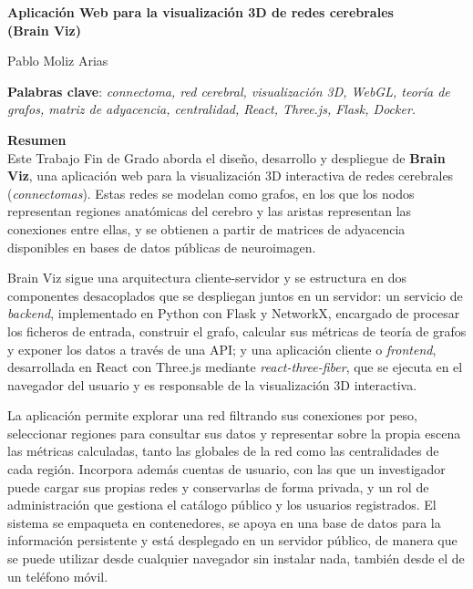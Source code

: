 \thispagestyle{empty}

\begin{center}
{\large\bfseries Aplicación Web para la visualización 3D de redes cerebrales \\ \textnormal{\normalsize (Brain Viz)} }\\
\end{center}
\begin{center}
Pablo Moliz Arias\\
\end{center}


\vspace{0.5cm}
\noindent\textbf{Palabras clave}: \textit{connectoma, red cerebral, visualización 3D, WebGL,
teoría de grafos, matriz de adyacencia, centralidad, React, Three.js, Flask, Docker.}
\vspace{0.7cm}

\noindent\textbf{Resumen}\\
Este Trabajo Fin de Grado aborda el diseño, desarrollo y despliegue de \textbf{Brain Viz}, una
aplicación web para la visualización 3D interactiva de redes cerebrales (\textit{connectomas}).
Estas redes se modelan como grafos, en los que los nodos representan regiones anatómicas del cerebro
y las aristas representan las conexiones entre ellas, y se obtienen a partir de matrices de
adyacencia disponibles en bases de datos públicas de neuroimagen.

Brain Viz sigue una arquitectura cliente-servidor y se estructura en dos componentes desacoplados
que se despliegan juntos en un servidor: un servicio de \textit{backend}, implementado en Python
con Flask y NetworkX, encargado de procesar los ficheros de entrada, construir el grafo, calcular
sus métricas de teoría de grafos y exponer los datos a través de una API; y una aplicación
cliente o \textit{frontend}, desarrollada en React con Three.js mediante \textit{react-three-fiber},
que se ejecuta en el navegador del usuario y es responsable de la visualización 3D interactiva.

La aplicación permite explorar una red filtrando sus conexiones por peso, seleccionar regiones para
consultar sus datos y representar sobre la propia escena las métricas calculadas, tanto las globales
de la red como las centralidades de cada región. Incorpora además cuentas de usuario, con las que un
investigador puede cargar sus propias redes y conservarlas de forma privada, y un rol de
administración que gestiona el catálogo público y los usuarios registrados. El sistema se empaqueta
en contenedores, se apoya en una base de datos para la información persistente y está desplegado en
un servidor público, de manera que se puede utilizar desde cualquier navegador sin instalar nada,
también desde el de un teléfono móvil.

